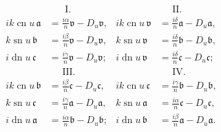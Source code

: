 \documentclass[11pt,leqno,oneside,letterpaper]{book}[2005/09/16]
\DeclareMathOperator{\sn}{sn}
\DeclareMathOperator{\cn}{cn}
\DeclareMathOperator{\dn}{dn}
\begin{document}
\begin{align*}
  &\mspace{30mu}\text{I.}  &&\mspace{25mu}\text{II.}
\\
  ik\cn u \,\mathfrak{a}
&= \frac{i\alpha}{n}\mathfrak{v} - D_u\mathfrak{v},
& ik\cn u \,\mathfrak{v}
&= \frac{i\delta}{n}\mathfrak{a} - D_u\mathfrak{a},
\\
   k\sn u \,\mathfrak{b}
&= \frac{i\beta} {n}\mathfrak{v} - D_u\mathfrak{v},
&  k\sn u \,\mathfrak{v}
&= \frac{i\delta}{n}\mathfrak{b} - D_u\mathfrak{b},
\\
  i \dn u \,\mathfrak{c}
&= \frac{i\gamma}{n}\mathfrak{v} - D_u\mathfrak{v};
& i \dn u \,\mathfrak{v}
&= \frac{i\delta}{n}\mathfrak{c} - D_u\mathfrak{c};
\\[2ex]
  &\mspace{25mu}\text{III.}  &&\mspace{25mu}\text{IV.}
\\
  ik\cn u \,\mathfrak{b}
&= \frac{i\beta} {n}\mathfrak{c} - D_u\mathfrak{c},
& ik\cn u \,\mathfrak{c}
&= \frac{i\gamma}{n}\mathfrak{b} - D_u\mathfrak{b},
\\
   k\sn u \,\mathfrak{c}
&= \frac{i\gamma}{n}\mathfrak{a} - D_u\mathfrak{a},
&  k\sn u \,\mathfrak{a}
&= \frac{i\alpha}{n}\mathfrak{c} - D_u\mathfrak{c},
\\
   i\dn u \,\mathfrak{a}
&= \frac{i\alpha}{n}\mathfrak{b} - D_u\mathfrak{b};
& i \dn u \,\mathfrak{b}
&= \frac{i\beta}{n}\mathfrak{a} - D_u\mathfrak{a}.
\end{align*}
\end{document}
